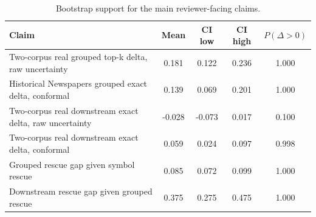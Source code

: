 \begin{table}[t]
\caption{Bootstrap support for the main reviewer-facing claims.}
\label{tab:appendix_robustness}
\centering
\footnotesize
\setlength{\tabcolsep}{4pt}
\renewcommand{\arraystretch}{1.06}
\begin{tabular}{|p{5.2cm}|c|c|c|c|}
\hline
\textbf{Claim} & \textbf{Mean} & \textbf{CI low} & \textbf{CI high} & \textbf{$P(\Delta > 0)$} \\
\hline
Two-corpus real grouped top-k delta, raw uncertainty & 0.181 & 0.122 & 0.236 & 1.000 \\
\hline
Historical Newspapers grouped exact delta, conformal & 0.139 & 0.069 & 0.201 & 1.000 \\
\hline
Two-corpus real downstream exact delta, raw uncertainty & -0.028 & -0.073 & 0.017 & 0.100 \\
\hline
Two-corpus real downstream exact delta, conformal & 0.059 & 0.024 & 0.097 & 0.998 \\
\hline
Grouped rescue gap given symbol rescue & 0.085 & 0.072 & 0.099 & 1.000 \\
\hline
Downstream rescue gap given grouped rescue & 0.375 & 0.275 & 0.475 & 1.000 \\
\hline
\end{tabular}
\end{table}
